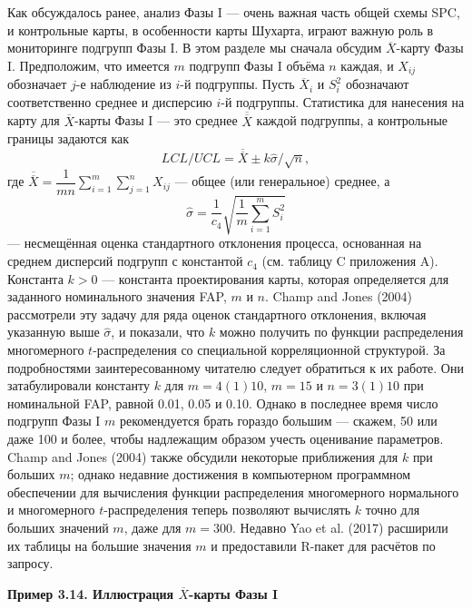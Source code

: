 Как обсуждалось ранее, анализ Фазы I — очень важная часть общей схемы SPC, и контрольные карты, в особенности карты Шухарта, играют важную роль в мониторинге подгрупп Фазы I. В этом разделе мы сначала обсудим \(\overline{X}\)-карту Фазы I. Предположим, что имеется \(m\) подгрупп Фазы I объёма \(n\) каждая, и \(X_{ij}\) обозначает \(j\)-е наблюдение из \(i\)-й подгруппы. Пусть \(\overline{X}_i\) и \(S_i^2\) обозначают соответственно среднее и дисперсию \(i\)-й подгруппы. Статистика для нанесения на карту для \(\overline{X}\)-карты Фазы I — это среднее \(\overline{\overline{X}}\) каждой подгруппы, а контрольные границы задаются как
\[
	LCL/UCL = \overline{\overline{X}} \pm k\hat{\sigma}/\sqrt{n},
\]
где \(\overline{\overline{X}} = \dfrac{1}{mn}\sum_{i=1}^{m}\sum_{j=1}^{n} X_{ij}\) — общее (или генеральное) среднее, а
\[
	\hat{\sigma} = \frac{1}{c_4}\sqrt{\frac{1}{m}\sum_{i=1}^{m} S_i^2}
\]
— несмещённая оценка стандартного отклонения процесса, основанная на среднем дисперсий подгрупп с константой \(c_4\) (см. таблицу C приложения A). Константа \(k > 0\) — константа проектирования карты, которая определяется для заданного номинального значения FAP, \(m\) и \(n\). Champ and Jones (2004) рассмотрели эту задачу для ряда оценок стандартного отклонения, включая указанную выше \(\hat{\sigma}\), и показали, что \(k\) можно получить по функции распределения многомерного \(t\)-распределения со специальной корреляционной структурой. За подробностями заинтересованному читателю следует обратиться к их работе. Они затабулировали константу \(k\) для \(m = 4(1)10\), \(m = 15\) и \(n = 3(1)10\) при номинальной FAP, равной 0.01, 0.05 и 0.10. Однако в последнее время число подгрупп Фазы I \(m\) рекомендуется брать гораздо большим — скажем, 50 или даже 100 и более, чтобы надлежащим образом учесть оценивание параметров. Champ and Jones (2004) также обсудили некоторые приближения для \(k\) при больших \(m\); однако недавние достижения в компьютерном программном обеспечении для вычисления функции распределения многомерного нормального и многомерного \(t\)-распределения теперь позволяют вычислять \(k\) точно для больших значений \(m\), даже для \(m = 300\). Недавно Yao et al. (2017) расширили их таблицы на большие значения \(m\) и предоставили R-пакет для расчётов по запросу.

\noindent\textbf{Пример 3.14. Иллюстрация \(\overline{X}\)-карты Фазы I}

